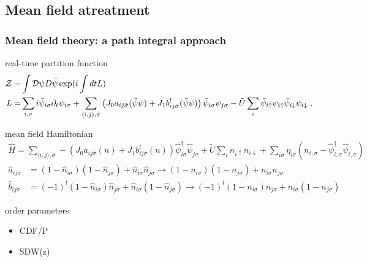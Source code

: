 \documentclass[]{beamer}
\begin{document}
\subsection{Mean field atreatment}
\begin{frame}\frametitle{Mean field theory: a path integral approach}
\pause
\vspace{-2ex}
\begin{block}{real-time partition function}
\vspace{-2ex}
\begin{align*}
    \mathcal{Z}=&\int \mathcal D\psi D\bar\psi \exp(i\int dt L)  \\
    L=&\sum_{i,\sigma} i\bar \psi_{i\sigma}\partial_t\psi_{i\sigma}
    +\sum_{\langle i,j\rangle,\sigma}\left(J_0a_{ij\bar{\sigma}}(\bar\psi \psi) 
        + J_1b_{ij\bar{\sigma}}^l(\bar\psi\psi)\right)\bar 
        \psi_{i\sigma}\psi_{j\sigma} \notag 
    - \tilde{U}\sum_{i}\bar\psi_{i\uparrow}\psi_{i\uparrow}
        \bar\psi_{i\downarrow}\psi_{i\downarrow} \  .
\end{align*}
\end{block}
\pause
\vspace{-1ex}
\begin{block}{mean field Hamiltonian}
\vspace{-2ex}
\begin{align*}
	\hat{H} = \sum_{\langle i,j\rangle, \sigma} 
    - \left(J_0a_{ij\bar{\sigma}}(n) 
                + J_1b_{ij\bar{\sigma}}^l(n)\right)
    \hat{\psi}^{\dagger}_{i\sigma}\hat{\psi}_{j\sigma}  
    + \tilde{U}\sum_{i}n_{i\uparrow}n_{i\downarrow}
    +\sum_{i \sigma}\eta_{i\sigma}(n_{i,\sigma}
                -\hat{\psi}^{\dagger}_{i,\sigma}\hat{\psi}_{i,\sigma}) 
\end{align*}
\vspace{-4ex}
\begin{align*}
\hat{a}_{ij\sigma} &= (1-\hat{n}_{i\sigma})(1-\hat{n}_{j\sigma}) 
    + \hat{n}_{i\sigma}\hat{n}_{j\sigma} 
    \rightarrow (1-n_{i\sigma})(1-n_{j\sigma}) + n_{i\sigma}n_{j\sigma}\\
\hat{b}_{ij\sigma} &= (-1)^l(1-\hat{n}_{i\sigma})\hat{n}_{j\sigma} 
    + \hat{n}_{i\sigma}(1-\hat{n}_{j\sigma})
    \rightarrow (-1)^l(1-n_{i\sigma})n_{j\sigma} + n_{i\sigma}(1-n_{j\sigma})
\end{align*}
\end{block}
\pause
\vspace{-1ex}
\begin{block}{order parameters}
\begin{itemize}
    \item CDF/P
    \item SDW(z)
\end{itemize}
\end{block}
\end{frame}
\end{document}
